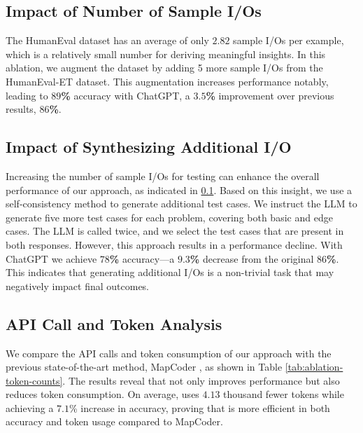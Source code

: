 

\subsection{Impact of Number of Sample I/Os}
\label{subsec:impact-of-sample-io}
The HumanEval dataset has an average of only $2.82$ sample I/Os per example, which is a relatively small number for deriving meaningful insights. In this ablation, we augment the dataset by adding 5 more sample I/Os from the HumanEval-ET dataset. This augmentation increases performance notably, leading to \textbf{$89$\%} accuracy with ChatGPT, a \textbf{$3.5$\%} improvement over previous results, \textbf{$86$\%}.





\subsection{Impact of Synthesizing Additional I/O}
\label{subsec:impact-of-additional-io}
Increasing the number of sample I/Os for testing can enhance the overall performance of our approach, as indicated in \ref{subsec:impact-of-sample-io}. Based on this insight, we use a self-consistency \cite{wang2023selfconsistency} method to generate additional test cases. We instruct the LLM to generate five more test cases for each problem, covering both basic and edge cases. The LLM is called twice, and we select the test cases that are present in both responses. However, this approach results in a performance decline. With ChatGPT we achieve \textbf{$78$\%} accuracy—a \textbf{$9.3$\%} decrease from the original \textbf{$86$\%}. This indicates that generating additional I/Os is a non-trivial task that may negatively impact final outcomes.

\subsection{API Call and Token Analysis}
\label{subsec:api-time-analysis}
We compare the API calls and token consumption of our approach with the previous state-of-the-art method, MapCoder \cite{islam-etal-2024-mapcoder}, as shown in Table \ref{tab:ablation-token-counts}. The results reveal that \tool not only improves performance but also reduces token consumption. On average, \tool uses $4.13$ thousand fewer tokens while achieving a $7.1$\% increase in accuracy, proving that \tool is more efficient in both accuracy and token usage compared to MapCoder.

